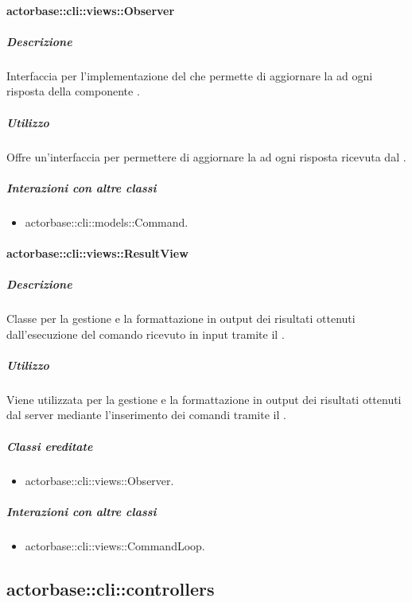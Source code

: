 \documentclass{scalatekids-article}
\begin{document}
\paragraph{actorbase::cli::views::Observer}

\subparagraph{Descrizione}

Interfaccia per l'implementazione del  
che permette di aggiornare la  ad ogni risposta della componente
.

\subparagraph{Utilizzo}

Offre un'interfaccia per permettere di aggiornare la  ad ogni
risposta ricevuta dal .

\subparagraph{Interazioni con altre classi}

\begin{itemize}
\item actorbase::cli::models::Command.
\end{itemize}

\paragraph{actorbase::cli::views::ResultView}

\subparagraph{Descrizione}

Classe per la gestione e la formattazione in output dei risultati ottenuti
dall'esecuzione del comando ricevuto in input tramite il  .

\subparagraph{Utilizzo}

Viene utilizzata per la gestione e la formattazione in output dei risultati
ottenuti dal server mediante l'inserimento dei comandi tramite il
 .

\subparagraph{Classi ereditate}

\begin{itemize}
\item actorbase::cli::views::Observer.
\end{itemize}

\subparagraph{Interazioni con altre classi}

\begin{itemize}
\item actorbase::cli::views::CommandLoop.
\end{itemize}

\subsection{actorbase::cli::controllers}
\end{document}
